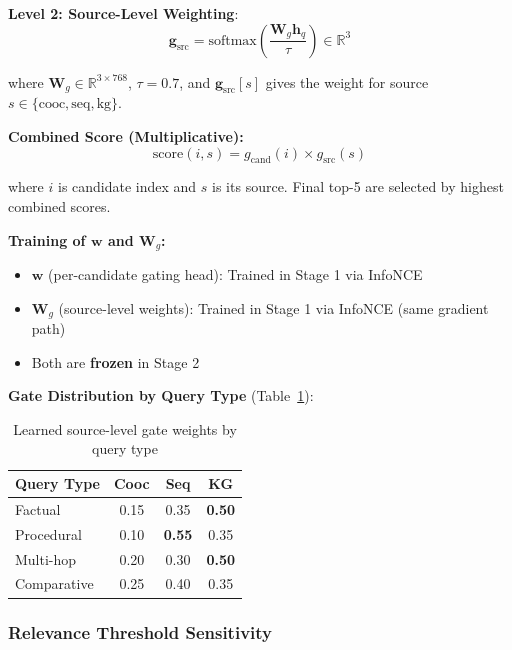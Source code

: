 \documentclass[10pt,twocolumn]{article}
\begin{document}
\textbf{Level 2: Source-Level Weighting}:
\begin{equation}
\mathbf{g}_{\text{src}} = \text{softmax}\left( \frac{\mathbf{W}_g \mathbf{h}_q}{\tau} \right) \in \mathbb{R}^3
\label{eq:source_gating}
\end{equation}

where $\mathbf{W}_g \in \mathbb{R}^{3 \times 768}$, $\tau=0.7$, and $\mathbf{g}_{\text{src}}[s]$ gives the weight for source $s \in \{\text{cooc}, \text{seq}, \text{kg}\}$.

\textbf{Combined Score (Multiplicative):}
\begin{equation}
\text{score}(i, s) = g_{\text{cand}}(i) \times g_{\text{src}}(s)
\label{eq:combined_score}
\end{equation}

where $i$ is candidate index and $s$ is its source. Final top-5 are selected by highest combined scores.

\textbf{Training of $\mathbf{w}$ and $\mathbf{W}_g$:}
\begin{itemize}
    \item $\mathbf{w}$ (per-candidate gating head): Trained in Stage 1 via InfoNCE
    \item $\mathbf{W}_g$ (source-level weights): Trained in Stage 1 via InfoNCE (same gradient path)
    \item Both are \textbf{frozen} in Stage 2
\end{itemize}

\textbf{Gate Distribution by Query Type} (Table~\ref{tab:gate_distribution}):

\begin{table}[h]
\centering
\caption{Learned source-level gate weights by query type}
\label{tab:gate_distribution}
\small
\begin{tabular}{@{}lccc@{}}
\toprule
\textbf{Query Type} & \textbf{Cooc} & \textbf{Seq} & \textbf{KG} \\
\midrule
Factual & 0.15 & 0.35 & \textbf{0.50} \\
Procedural & 0.10 & \textbf{0.55} & 0.35 \\
Multi-hop & 0.20 & 0.30 & \textbf{0.50} \\
Comparative & 0.25 & 0.40 & 0.35 \\
\bottomrule
\end{tabular}
\end{table}


\subsubsection{Relevance Threshold Sensitivity}
\label{sec:theta_sensitivity}
\end{document}
